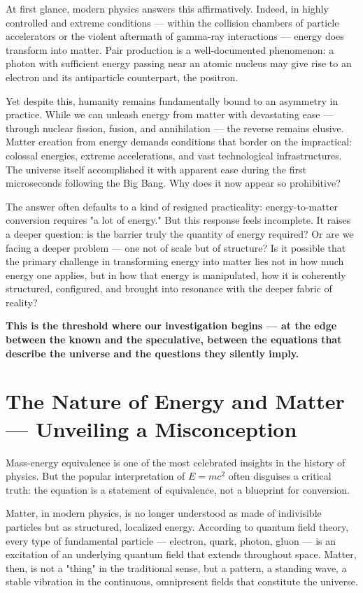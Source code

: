 \documentclass[12pt,a4paper]{article}
\begin{document}
At first glance, modern physics answers this affirmatively. Indeed, in highly controlled and extreme conditions — within the collision chambers of particle accelerators or the violent aftermath of gamma-ray interactions — energy does transform into matter. Pair production is a well-documented phenomenon: a photon with sufficient energy passing near an atomic nucleus may give rise to an electron and its antiparticle counterpart, the positron.

Yet despite this, humanity remains fundamentally bound to an asymmetry in practice. While we can unleash energy from matter with devastating ease — through nuclear fission, fusion, and annihilation — the reverse remains elusive. Matter creation from energy demands conditions that border on the impractical: colossal energies, extreme accelerations, and vast technological infrastructures. The universe itself accomplished it with apparent ease during the first microseconds following the Big Bang. Why does it now appear so prohibitive?

The answer often defaults to a kind of resigned practicality: energy-to-matter conversion requires "a lot of energy." But this response feels incomplete. It raises a deeper question: is the barrier truly the quantity of energy required? Or are we facing a deeper problem — one not of scale but of structure? Is it possible that the primary challenge in transforming energy into matter lies not in how much energy one applies, but in how that energy is manipulated, how it is coherently structured, configured, and brought into resonance with the deeper fabric of reality?

\textbf{This is the threshold where our investigation begins — at the edge between the known and the speculative, between the equations that describe the universe and the questions they silently imply.}

\section{The Nature of Energy and Matter — Unveiling a Misconception}

Mass-energy equivalence is one of the most celebrated insights in the history of physics. But the popular interpretation of $E = mc^2$ often disguises a critical truth: the equation is a statement of equivalence, not a blueprint for conversion.

Matter, in modern physics, is no longer understood as made of indivisible particles but as structured, localized energy. According to quantum field theory, every type of fundamental particle — electron, quark, photon, gluon — is an excitation of an underlying quantum field that extends throughout space. Matter, then, is not a "thing" in the traditional sense, but a pattern, a standing wave, a stable vibration in the continuous, omnipresent fields that constitute the universe.
\end{document}
